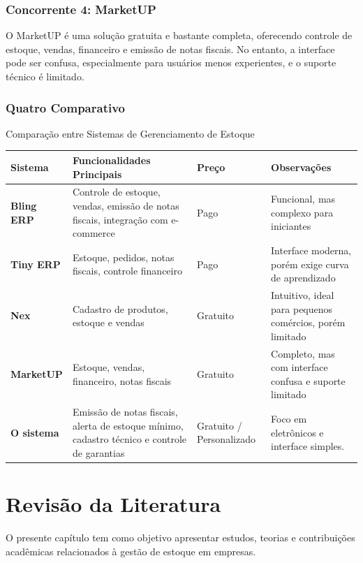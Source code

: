 \documentclass[
	12pt,				%
	openany,			%
	twoside,			%
	a4paper,			%
	english,			%
	brazil				%
	]{abntex2}
\begin{document}
\subsection{Concorrente 4: MarketUP}
O MarketUP é uma solução gratuita e bastante completa, oferecendo controle de estoque, vendas, financeiro e emissão de notas fiscais. No entanto, a interface pode ser confusa, especialmente para usuários menos experientes, e o suporte técnico é limitado.

\subsection{Quatro Comparativo}

\begin{quadro}[htb]
\caption{\label{quadro_comparativo}Comparação entre Sistemas de Gerenciamento de Estoque}
\begin{tabular}{|p{3.2cm}|p{5.5cm}|p{2.2cm}|p{4.1cm}|}
\hline
\textbf{Sistema} & \textbf{Funcionalidades Principais} & \textbf{Preço} & \textbf{Observações} \\
\hline
\textbf{Bling ERP} & Controle de estoque, vendas, emissão de notas fiscais, integração com e-commerce & Pago & Funcional, mas complexo para iniciantes \\
\hline
\textbf{Tiny ERP} & Estoque, pedidos, notas fiscais, controle financeiro & Pago & Interface moderna, porém exige curva de aprendizado \\
\hline
\textbf{Nex} & Cadastro de produtos, estoque e vendas & Gratuito & Intuitivo, ideal para pequenos comércios, porém limitado \\
\hline
\textbf{MarketUP} & Estoque, vendas, financeiro, notas fiscais & Gratuito & Completo, mas com interface confusa e suporte limitado \\
\hline
\textbf{O sistema} & Emissão de notas fiscais, alerta de estoque mínimo, cadastro técnico e controle de garantias & Gratuito / Personalizado & Foco em eletrônicos e interface simples. \\
\hline
\end{tabular}
\end{quadro}



\chapter{Revisão da Literatura}
O presente capítulo tem como objetivo apresentar estudos, teorias e contribuições acadêmicas relacionados à gestão de estoque em empresas.
\end{document}
